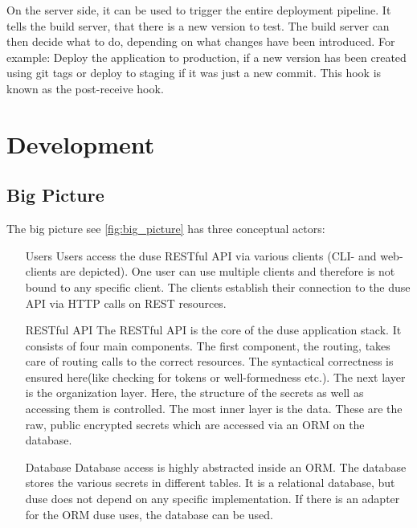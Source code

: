 On the server side, it can be used to trigger the entire deployment pipeline.
It tells the build server, that there is a new version to test. The build
server can then decide what to do, depending on what changes have been
introduced. For example: Deploy the application to production, if a new version
has been created using git tags or deploy to staging if it was just a new
commit. This hook is known as the post-receive hook.

\chapter{Development}

\section{Big Picture}

The big picture see \ref{fig:big_picture} has three conceptual actors:

\begin{enumerate}
  \item[Users] Users access the duse RESTful API via various
  clients (CLI- and web-clients are depicted). One user can use multiple
  clients and therefore is not bound to any specific client. The clients
  establish their connection to the duse API via HTTP calls on REST
  resources.

  \item[RESTful API] The RESTful API is the core of the
  duse application stack. It consists of four main components. The first
  component, the routing, takes care of routing calls to the correct
  resources. The syntactical correctness is ensured here(like checking
  for tokens or well-formedness etc.). The next layer is the organization
  layer. Here, the structure of the secrets as well as accessing them is
  controlled. The most inner layer is the data. These are the raw, public
  encrypted secrets which are accessed via an ORM on the database.

  \item[Database] Database access is highly abstracted inside an
  ORM. The database stores the various secrets in
  different tables. It is a relational database, but duse does not depend
  on any specific implementation. If there is an adapter for the ORM
  duse uses, the database can be used.
\end{enumerate}

